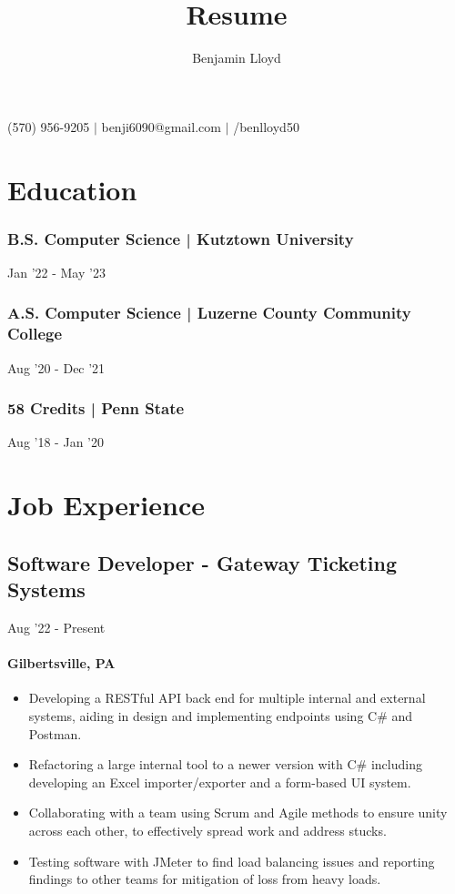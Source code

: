 \documentclass{article}
\makeatletter
\renewcommand{\maketitle}{
\begin{center}
{\huge\bfseries\theauthor}

\vspace{.25em}

{\faPhone{}}(570) 956-9205 $\vert$ {\faInbox{}}benji6090@gmail.com $\vert$ {\faGithub{}}/benlloyd50

\end{center}
}
\makeatother
\begin{document}
\title{Resume}

\author{Benjamin Lloyd}

\maketitle

\section{Education}
\subsubsection{B.S. Computer Science | Kutztown University} \hfill Jan '22 - May '23

\subsubsection{A.S. Computer Science | Luzerne County Community College} \hfill Aug '20 - Dec '21

\subsubsection{58 Credits | Penn State} \hfill Aug '18 - Jan '20

\section{Job Experience}
\subsection{Software Developer - Gateway Ticketing Systems} \hfill Aug '22 - Present
\paragraph{Gilbertsville, PA}

\begin{itemize}
    \item Developing a RESTful API back end for multiple internal and external systems, aiding in design and implementing endpoints using C\# and Postman.
    \item Refactoring a large internal tool to a newer version with C\# including developing an Excel importer/exporter and a form-based UI system.
    \item Collaborating with a team using Scrum and Agile methods to ensure unity across each other, to effectively spread work and address stucks.
    \item Testing software with JMeter to find load balancing issues and reporting findings to other teams for mitigation of loss from heavy loads.
\end{itemize}
\end{document}
